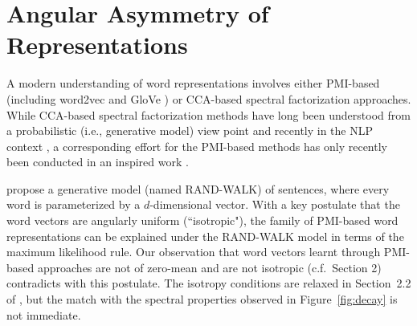 \documentclass{article} \usepackage{acl2017,times}
\begin{document}
\appendix


\section{Angular Asymmetry of Representations} 
\label{app:angular}
A modern understanding of word representations involves either PMI-based  (including word2vec \citep{mikolov2010recurrent,levy2014neural} and GloVe \citep{pennington2014glove}) or CCA-based  spectral factorization approaches. While CCA-based spectral factorization methods have long been understood from  a probabilistic (i.e., generative model) view point  \citep{browne1979maximum,hotelling1936relations} and   recently in the NLP context  \citep{stratos2015model},  a  corresponding  effort for the PMI-based methods has only recently been conducted in an inspired work   \citep{arora2015rand}. 

\citep{arora2015rand}  propose a generative model (named RAND-WALK) of sentences, where  every word is parameterized by a $d$-dimensional vector. With a key postulate that the word vectors are angularly uniform   (``isotropic"), the family of PMI-based word representations can be explained under the RAND-WALK model in terms of the maximum likelihood rule.  
Our observation that word vectors learnt through PMI-based approaches are not of zero-mean and are not isotropic (c.f.\ Section 2) contradicts with this postulate. The isotropy conditions  are  relaxed in Section~2.2  of \citep{arora2015rand}, but the match with the spectral properties observed in Figure~\ref{fig:decay} is not immediate.  
\end{document}
